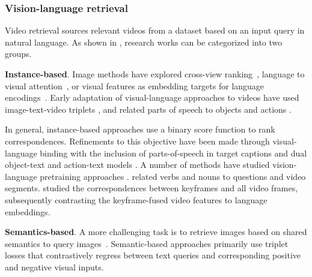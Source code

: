 \subsubsection{Vision-language retrieval} 


Video retrieval sources relevant videos from a dataset based on an input query in natural language. As shown in , research works can be categorized into two groups.


\noindent
\textbf{Instance-based}. Image methods have explored cross-view ranking~\citep{wang2016learning}, language to visual attention~\citep{torabi2016learning}, or visual features as embedding targets for language encodings~\citep{dong2018predicting}. Early adaptation of visual-language approaches to videos have used image-text-video triplets \citep{otani2016learning}, and related parts of speech to objects and actions \citep{gabeur2020multi,xu2015jointly}. %


In general, instance-based approaches use a binary score function to rank correspondences. Refinements to this objective have been made through visual-language binding with the inclusion of parts-of-speech in target captions \citep{wray2019fine} and dual object-text and action-text models \citep{liu2019use,mithun2018learning}. A number of methods have studied vision-language pretraining approaches \citep{ge2022bridging,lin2022egocentric,xue2022advancing}. \citet{ge2022bridging} related verbs and nouns to questions and video segments. \citet{xue2022advancing} studied the correspondences between keyframes and all video frames, subsequently contrasting the keyframe-fused video features to language embeddings.



\noindent
\textbf{Semantics-based}. A more challenging task is to retrieve images based on shared semantics to query images~\citep{gordo2017beyond}. Semantic-based approaches primarily use triplet losses that contrastively regress between text queries and corresponding positive and negative visual inputs.

